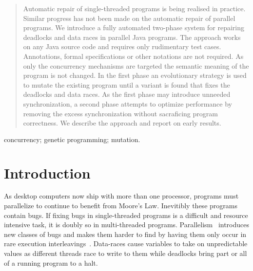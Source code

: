\documentclass[10pt, conference, compsocconf]{IEEEtran}
\begin{document}
\begin{abstract}

Automatic repair of single-threaded programs is being realised in practice.
Similar progress has not been made on the automatic repair of parallel
programs.  We introduce a fully automated two-phase system for repairing
deadlocks and data races in parallel Java programs. The approach works on any
Java source code and requires only rudimentary test cases. Annotations, formal
specifications or other notations are not required. As only the concurrency
mechanisms are targeted the semantic meaning of the program is not changed. In
the first phase an evolutionary strategy is used to mutate the existing program
until a variant is found that fixes the deadlocks and data races. As the first
phase may introduce unneeded synchronization, a second phase attempts to
optimize performance by removing the excess synchronization without sacraficing
program correctness. We describe the approach and report on early results.

\end{abstract}

\begin{IEEEkeywords}
concurrency; genetic programming; mutation.

\end{IEEEkeywords}


%
\IEEEpeerreviewmaketitle



\section{Introduction}
\label{sec:introduction}

As desktop computers now ship with more than one processor, programs must
parallelize to continue to benefit from Moore's Law. Inevitibly these programs
contain bugs. If fixing bugs in single-threaded programs is a difficult
and resource intensive task,  it is doubly so in multi-threaded programs.
Parallelism~\cite{SL05} introduces new classes of bugs and makes them harder to
find by having them only occur in rare execution interleavings~\cite{MQB07}.
Data-races cause variables to take on unpredictable values as different threads
race to write to them while deadlocks bring part or all of a running program to
a halt.
\end{document}
